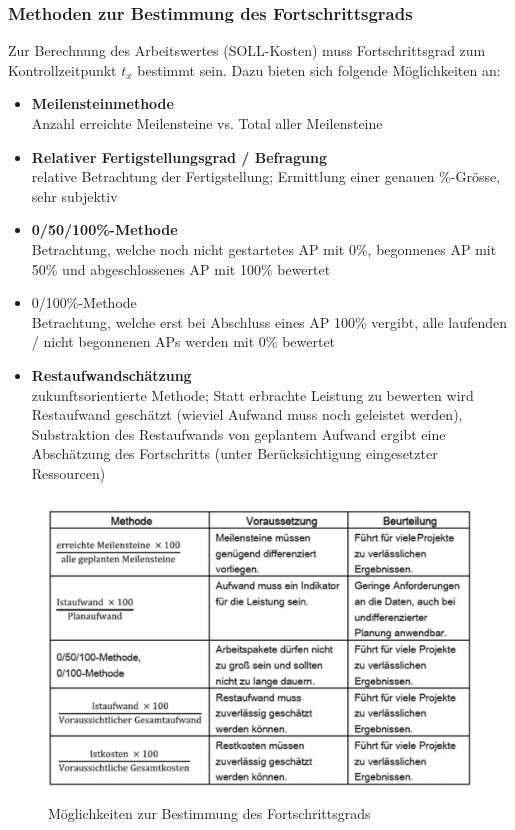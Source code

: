 \documentclass[a4paper]{article}
\begin{document}
		\subsubsection{Methoden zur Bestimmung des Fortschrittsgrads}
		
		Zur Berechnung des Arbeitswertes (SOLL-Kosten) muss Fortschrittsgrad zum Kontrollzeitpunkt $t_x$ bestimmt sein.
		Dazu bieten sich folgende Möglichkeiten an:
		\vspace{1em}
		\begin{itemize}
			\item \textbf{Meilensteinmethode}\\ 
				Anzahl erreichte Meilensteine vs. Total aller Meilensteine
			\item \textbf{Relativer Fertigstellungsgrad / Befragung}\\
				relative Betrachtung der Fertigstellung;
				Ermittlung einer genauen \%-Grösse, sehr subjektiv
			\item \textbf{0/50/100\%-Methode}\\
				Betrachtung, welche noch nicht gestartetes AP mit 0\%, begonnenes AP mit 50\% und abgeschlossenes AP mit 100\% bewertet
			\item 0/100\%-Methode\\
				Betrachtung, welche erst bei Abschluss eines AP 100\% vergibt, alle laufenden / nicht begonnenen APs werden mit 0\% bewertet
			\item \textbf{Restaufwandschätzung}\\ 
				zukunftsorientierte Methode;
				Statt erbrachte Leistung zu bewerten wird Restaufwand geschätzt (wieviel Aufwand muss noch geleistet werden), Substraktion des Restaufwands von geplantem Aufwand ergibt eine Abschätzung des Fortschritts (unter Berücksichtigung eingesetzter Ressourcen)
		\end{itemize}
		
		\begin{figure}[!htb]
			\centering
			\includegraphics[height=8cm]{img/pm/fg_methoden.png}
			\caption{Möglichkeiten zur Bestimmung des Fortschrittsgrads}
			\label{fig:pm_fg_methoden}
		\end{figure}
	
\end{document}
